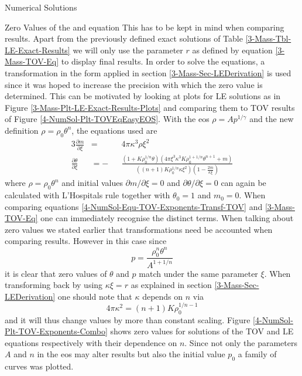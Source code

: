 \begin{section}{Numerical Solutions}
\begin{subsection}{Zero Values of the  and  equation}
This has to be kept in mind when comparing results. 
Apart from the previously defined exact solutions of Table \ref{3-Mass-Tbl-LE-Exact-Results} we will only use the parameter $r$ as defined by equation \eqref{3-Mass-TOV-Eq} to display final results.
In order to solve the equations, a transformation in the form applied in section \ref{3-Mass-Sec-LEDerivation} is used since it was hoped to increase the precision with which the zero value is determined.
This can be motivated by looking at plots for \ac{LE} solutions as in Figure \ref{3-Mass-Plt-LE-Exact-Results-Plots} and comparing them to \ac{TOV} results of Figure \ref{4-NumSol-Plt-TOVEqEasyEOS}.
With the \ac{eos} $\rho=Ap^{1/\gamma}$ and the new definition $\rho=\rho_0\theta^n$, the equations used are 
\begin{alignat}{3}
	\frac{\partial m}{\partial\xi} &= &&4\pi\kappa^3\rho\xi^2\\
	\frac{\partial\theta}{\partial\xi} &= -&&\frac{\left(1+K\rho_0^{1/n}\theta\right)\left(4\pi\xi^3\kappa^3K\rho_0^{1+1/n}\theta^{n+1}+ m\right)}{\left((n+1)K\rho_0^{1/n}\kappa\xi^2\right)\left(1-\frac{2 m}{\kappa\xi}\right)}
	\label{4-NumSol-Equ-TOV-Exponents-Transf-TOV}
\end{alignat}
where $\rho=\rho_0\theta^n$ and initial values $\partial m/\partial\xi=0$ and $\partial\theta/\partial\xi=0$ can again be calculated with L'Hospitals rule together with $\theta_0=1$ and $ m_0=0$.
When comparing equations \eqref{4-NumSol-Equ-TOV-Exponents-Transf-TOV} and \eqref{3-Mass-TOV-Eq} one can immediately recognise the distinct terms.
When talking about zero values we stated earlier that transformations need be accounted when comparing results.
However in this case since
\begin{equation}
	p=\frac{\rho_0^n\theta^n}{A^{1+1/n}}
\end{equation}
it is clear that zero values of $\theta$ and $p$ match under the same parameter $\xi$.
When transforming back by using $\kappa\xi=r$ as explained in section \ref{3-Mass-Sec-LEDerivation} one should note that $\kappa$ depends on $n$ via 
\begin{equation}
	4\pi\kappa^2=(n+1)K\rho_0^{1/n-1}
\end{equation}
and it will thus change values by more than constant scaling.
Figure \ref{4-NumSol-Plt-TOV-Exponents-Combo} shows zero values for solutions of the \ac{TOV} and \ac{LE} equations respectively with their dependence on $n$.
Since not only the parameters $A$ and $n$ in the \ac{eos} may alter results but also the initial value $p_0$ a family of curves was plotted.

\end{subsection}
\end{section}
